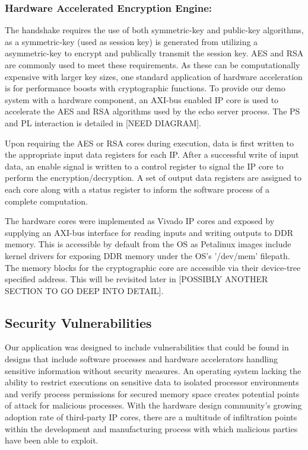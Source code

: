 \documentclass[sigconf]{acmart}
\theoremstyle{plain}
\theoremstyle{remark}
\begin{document}
\subsubsection{Hardware Accelerated Encryption Engine:}
The handshake requires the use of both symmetric-key and public-key algorithms, as a symmetric-key (used as session key) is generated from utilizing a asymmetric-key to encrypt and publically transmit the session key. AES and RSA are commonly used to meet these requirements. As these can be computationally expensive with larger key sizes, one standard application of hardware acceleration is for performance boosts with cryptographic functions. To provide our demo system with a hardware component, an AXI-bus enabled IP core is used to accelerate the AES and RSA algorithms used by the echo server process. The PS and PL interaction is detailed in [NEED DIAGRAM].

Upon requiring the AES or RSA cores during execution, data is first written to the appropriate input data registers for each IP. After a successful write of input data, an enable signal is written to a control register to signal the IP core to perform the encryption/decryption. A set of output data registers are assigned to each core along with a status register to inform the software process of a complete computation.

The hardware cores were implemented as Vivado IP cores and exposed by supplying an AXI-bus interface for reading inputs and writing outputs to DDR memory. This is accessible by default from the OS as Petalinux images include kernel drivers for exposing DDR memory under the OS's '/dev/mem' filepath. The memory blocks for the cryptographic core are accessible via their device-tree specified address. This will be revisited later in [POSSIBLY ANOTHER SECTION TO GO DEEP INTO DETAIL].




\subsection{Security Vulnerabilities}

Our application was designed to include vulnerabilities that could be found in designs that include software processes and hardware accelerators handling sensitive information without security measures. An operating system lacking the ability to restrict executions on sensitive data to isolated processor environments and verify process permissions for secured memory space creates potential points of attack for malicious processes. With the hardware design community's growing adoption rate of third-party IP cores, there are a multitude of infiltration points within the development and manufacturing process with which malicious parties have been able to exploit.
\end{document}
